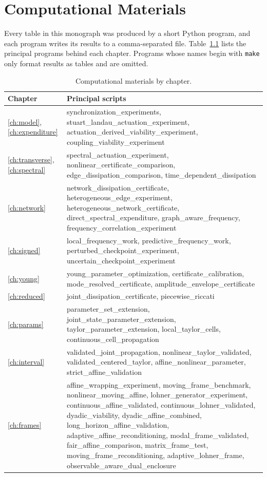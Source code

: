 \documentclass[11pt,notitlepage]{report}
\theoremstyle{definition}
\theoremstyle{remark}
\begin{document}
\chapter{Computational Materials}\label{app:materials}
Every table in this monograph was produced by a short Python program, and each program writes its results to a comma-separated file. Table~\ref{tab:materials} lists the principal programs behind each chapter. Programs whose names begin with \texttt{make} only format results as tables and are omitted.
\begin{table}[ht]\centering\small
\caption{Computational materials by chapter.}\label{tab:materials}
\begin{tabular}{@{}p{2.2cm}p{9.6cm}@{}}\toprule
Chapter&Principal scripts\\\midrule
\ref{ch:model}, \ref{ch:expenditure}&synchronization\_experiments, stuart\_landau\_actuation\_experiment, actuation\_derived\_viability\_experiment, coupling\_viability\_experiment\\
\ref{ch:transverse}, \ref{ch:spectral}&spectral\_actuation\_experiment, nonlinear\_certificate\_comparison, edge\_dissipation\_comparison, time\_dependent\_dissipation\\
\ref{ch:network}&network\_dissipation\_certificate, heterogeneous\_edge\_experiment, heterogeneous\_network\_certificate, direct\_spectral\_expenditure, graph\_aware\_frequency, frequency\_correlation\_experiment\\
\ref{ch:signed}&local\_frequency\_work, predictive\_frequency\_work, perturbed\_checkpoint\_experiment, uncertain\_checkpoint\_experiment\\
\ref{ch:young}&young\_parameter\_optimization, certificate\_calibration, mode\_resolved\_certificate, amplitude\_envelope\_certificate\\
\ref{ch:reduced}&joint\_dissipation\_certificate, piecewise\_riccati\\
\ref{ch:params}&parameter\_set\_extension, joint\_state\_parameter\_extension, taylor\_parameter\_extension, local\_taylor\_cells, continuous\_cell\_propagation\\
\ref{ch:interval}&validated\_joint\_propagation, nonlinear\_taylor\_validated, validated\_centered\_taylor, affine\_nonlinear\_parameter, strict\_affine\_validation\\
\ref{ch:frames}&affine\_wrapping\_experiment, moving\_frame\_benchmark, nonlinear\_moving\_affine, lohner\_generator\_experiment, continuous\_affine\_validated, continuous\_lohner\_validated, dyadic\_viability, dyadic\_affine\_combined, long\_horizon\_affine\_validation, adaptive\_affine\_reconditioning, modal\_frame\_validated, fair\_affine\_comparison, matrix\_frame\_test, moving\_frame\_reconditioning, adaptive\_lohner\_frame, observable\_aware\_dual\_enclosure\\\bottomrule
\end{tabular}
\end{table}
\end{document}
